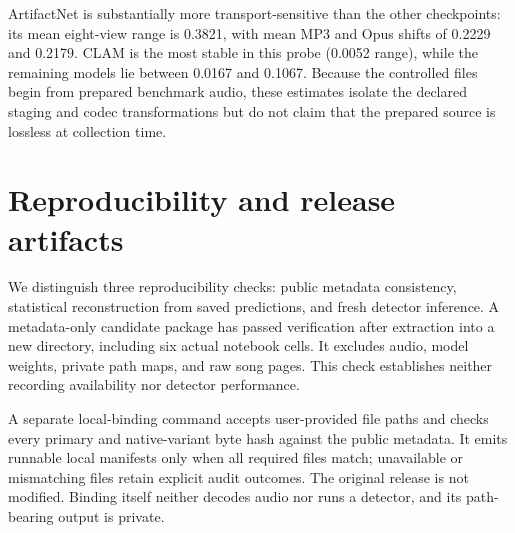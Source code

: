 \documentclass[10pt,a4paper]{article}
\begin{document}
ArtifactNet is substantially more transport-sensitive than the other
checkpoints: its mean eight-view range is 0.3821, with mean MP3 and Opus shifts
of 0.2229 and 0.2179. CLAM is the most stable in this probe (0.0052 range),
while the remaining models lie between 0.0167 and 0.1067. Because the
controlled files begin from prepared benchmark audio, these estimates isolate
the declared staging and codec transformations but do not claim that the
prepared source is lossless at collection time.

\section{Reproducibility and release artifacts}

We distinguish three reproducibility checks: public metadata consistency,
statistical reconstruction from saved predictions, and fresh detector inference.
A metadata-only candidate package has passed verification after extraction into
a new directory, including six actual notebook cells. It excludes audio, model
weights, private path maps, and raw song pages. This check establishes neither
recording availability nor detector performance.

A separate local-binding command accepts user-provided file paths and checks
every primary and native-variant byte hash against the public metadata. It
emits runnable local manifests only when all required files match; unavailable
or mismatching files retain explicit audit outcomes. The original release is
not modified. Binding itself neither decodes audio nor runs a detector, and
its path-bearing output is private.
\end{document}
